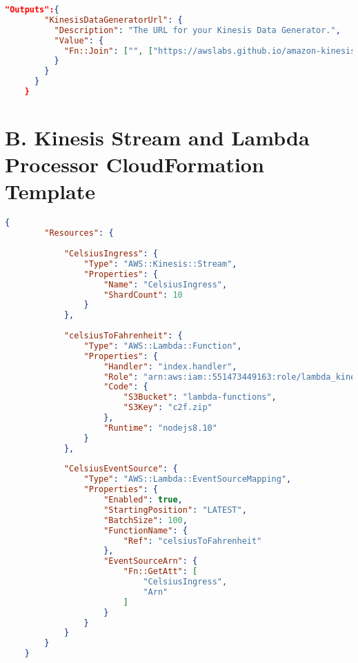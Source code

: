 \begin{lstlisting}[language=json,firstnumber=1]
      "Outputs":{
        "KinesisDataGeneratorUrl": {
          "Description": "The URL for your Kinesis Data Generator.",
          "Value": {
            "Fn::Join": ["", ["https://awslabs.github.io/amazon-kinesis-data-generator/web/producer.html?", { "Fn::GetAtt": [ "SetupCognitoCustom", "Querystring" ] }]]
          }
        }
      }
    }
    \end{lstlisting}\centering\autocite{https://github.com/awslabs/amazon-kinesis-client-nodejs}

\pagebreak

\section*{B. Kinesis Stream and Lambda Processor CloudFormation Template}\label{app:ingressProcessSL}
    \begin{lstlisting}[language=json,firstnumber=1]
    {
        "Resources": {
        
            "CelsiusIngress": {
                "Type": "AWS::Kinesis::Stream",
                "Properties": {
                    "Name": "CelsiusIngress",
                    "ShardCount": 10
                }
            },
            
            "celsiusToFahrenheit": {
                "Type": "AWS::Lambda::Function",
                "Properties": {
                    "Handler": "index.handler",
                    "Role": "arn:aws:iam::551473449163:role/lambda_kinesis_role",
                    "Code": {
                        "S3Bucket": "lambda-functions",
                        "S3Key": "c2f.zip"
                    },
                    "Runtime": "nodejs8.10"
                }
            },
            
            "CelsiusEventSource": {
                "Type": "AWS::Lambda::EventSourceMapping",
                "Properties": {
                    "Enabled": true,
                    "StartingPosition": "LATEST",
                    "BatchSize": 100,
                    "FunctionName": {
                        "Ref": "celsiusToFahrenheit"
                    },
                    "EventSourceArn": {
                        "Fn::GetAtt": [
                            "CelsiusIngress",
                            "Arn"
                        ]
                    }
                }
            }
        }
    }
    \end{lstlisting}\centering
